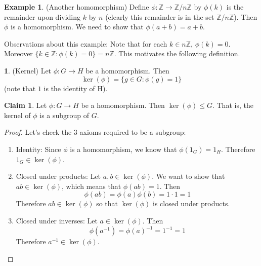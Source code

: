 \documentclass[12pt]{article}
\theoremstyle{definition}
\newtheorem{definition}{\color{NavyBlue}{\textbf{Definition}}}
\newtheorem{claim}{\color{JungleGreen}Claim}
\newtheorem{example}{\color{WildStrawberry}Example}
\theoremstyle{definition}
\begin{document}
\begin{example}(Another homomorphism)
Define $\phi : \mathbb{Z} \to \mathbb{Z} / n \mathbb{Z}$ by $\phi(k)$ is the remainder upon dividing $k$ by $n$ (clearly this remainder is in the set $\mathbb{Z} / n \mathbb{Z}$). Then $\phi$ is a homomorphism. We need to show that $\phi(a + b) = a + b$.  

Observations about this example: Note that for each $k \in n \mathbb{Z}$, $\phi(k) = 0$. Moreover $\{ k \in \mathbb{Z} : \phi(k) = 0 \} = n \mathbb{Z}$. This motivates the following definition.
\end{example}

\begin{definition}(Kernel)
Let $\phi:G \to H$ be a homomorphism. Then
\begin{equation}
	\ker(\phi) = \{g \in G : \phi(g) = 1 \}
\end{equation}
(note that $1$ is the identity of H).
\end{definition}

\begin{claim}
Let $\phi: G \to H$ be a homomorphism. Then $\ker(\phi) \leq G$. That is, the kernel of $\phi$ is a subgroup of $G$.
\end{claim}
\begin{proof}
Let's check the 3 axioms required to be a subgroup:
\begin{enumerate}
	\item Identity: Since $\phi$ is a homomorphism, we know that $\phi(1_G) = 1_H$. Therefore $1_G \in \ker(\phi)$.
	\item Closed under products: Let $a,b \in \ker(\phi)$. We want to show that $ab \in \ker(\phi)$, which means that $\phi(ab) = 1$. Then
	\begin{equation}
		\phi(ab) = \phi(a) \phi(b) = 1 \cdot 1 = 1
	\end{equation}
	Therefore $ab \in \ker(\phi)$ so that $\ker(\phi)$ is closed under products. 
	\item Closed under inverses: Let $a \in \ker(\phi)$. Then
	\begin{equation}
		\phi(a^{-1}) = \phi(a)^{-1} = 1^{-1} = 1
	\end{equation}
	Therefore $a^{-1} \in \ker(\phi)$. 
\end{enumerate}
\end{proof}
\end{document}
